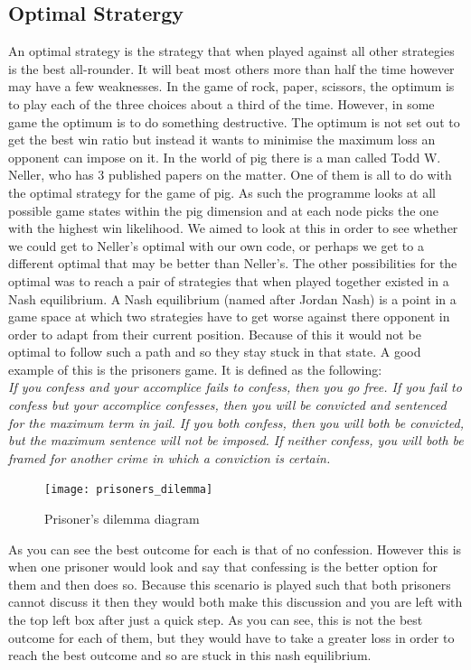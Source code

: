 \documentclass[a4paper,titlepage]{article}
\begin{document}
\subsection{Optimal Stratergy}
An optimal strategy is the strategy that when played against all other strategies is the best all-rounder.
It will beat most others more than half the time however may have a few weaknesses.
In the game of rock, paper, scissors, the optimum is to play each of the three choices about a third of the time.
However, in some game the optimum is to do something destructive. The optimum is not set out to get the best
win ratio but instead it wants to minimise the maximum loss an opponent can impose on it.
In the world of pig there is a man called Todd W. Neller, who has 3 published papers on the matter.
One of them is all to do with the optimal strategy for the game of pig. As such the programme looks at all possible
game states within the pig dimension and at each node picks the one with the highest win likelihood.
We aimed to look at this in order to see whether we could get to Neller’s optimal with our own code,
or perhaps we get to a different optimal that may be better than Neller’s.
The other possibilities for the optimal was to reach a pair of strategies that when played together existed in a Nash equilibrium.
A Nash equilibrium (named after Jordan Nash) is a point in a game space at which two strategies have to get worse against there opponent
in order to adapt from their current position. Because of this it would not be optimal to follow such a path and so they stay stuck in that state.
A good example of this is the prisoners game. It is defined as the following: \\
\textit{If you confess and your accomplice fails to confess, then you go free. If you fail to confess but your accomplice confesses, then you will be convicted and sentenced for the maximum term in jail. If you both confess, then you will both be convicted, but the maximum sentence will not be imposed. If neither confess, you will both be framed for another crime in which a conviction is certain.}\\

\begin{figure}
\centering
\texttt{[image: prisoners\_dilemma]}
\caption{Prisoner's dilemma diagram\label{figure3}}
\end{figure}

As you can see the best outcome for each is that of no confession. However this is when one prisoner would look and say that confessing is the better
option for them and then does so. Because this scenario is played such that both prisoners cannot discuss it then they would both make this discussion
and you are left with the top left box after just a quick step. As you can see, this is not the best outcome for each of them, but they would have to
take a greater loss in order to reach the best outcome and so are stuck in this nash equilibrium.
\end{document}
